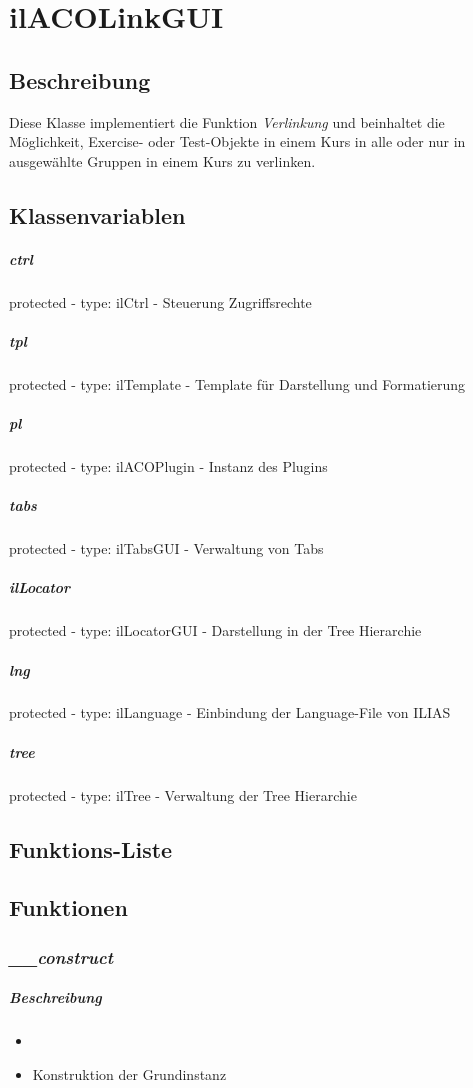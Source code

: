 \section{ilACOLinkGUI}

\subsection*{Beschreibung}
Diese Klasse implementiert die Funktion \textit{Verlinkung} und beinhaltet die Möglichkeit, Exercise- oder Test-Objekte in einem Kurs in alle oder nur in ausgewählte Gruppen in einem Kurs zu verlinken.

\subsection*{Klassenvariablen}
\subparagraph{ctrl}
protected - type: ilCtrl - Steuerung Zugriffsrechte
\subparagraph{tpl}
protected - type: ilTemplate - Template für Darstellung und Formatierung
\subparagraph{pl}
protected - type: ilACOPlugin - Instanz des Plugins
\subparagraph{tabs}
protected - type: ilTabsGUI - Verwaltung von Tabs
\subparagraph{ilLocator}
protected - type: ilLocatorGUI - Darstellung in der Tree Hierarchie
\subparagraph{lng}
protected - type: ilLanguage - Einbindung der Language-File von ILIAS
\subparagraph{tree}
protected - type: ilTree - Verwaltung der Tree Hierarchie

\subsection*{Funktions-Liste}
\subparagraph{}
\subparagraph{}
\subparagraph{}
\subparagraph{}
\subparagraph{}
\subparagraph{}
\subparagraph{}
\subparagraph{}
\subparagraph{}
\subparagraph{}
\subparagraph{}
\subparagraph{}
\subparagraph{}
\subparagraph{}
\subparagraph{}

\subsection*{Funktionen}

\subsubsection*{\textit{\_\_construct}}\label{constructLGUI}
\subparagraph{Beschreibung}
\begin{itemize}
	\item[] \noindent{} 
	\item[] Konstruktion der Grundinstanz
\end{itemize}


